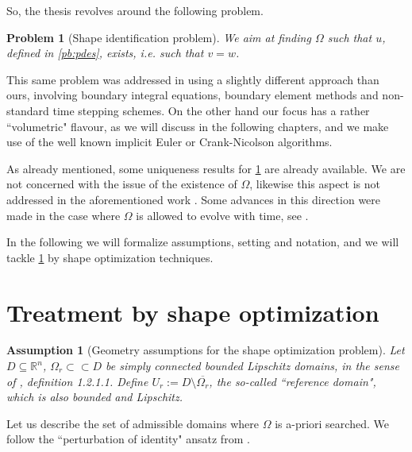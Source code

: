 \documentclass[english,a4paper,10pt,oneside]{scrbook}	%
\theoremstyle{break}
\newtheorem{ass}[equation]{Assumption}
\newtheorem{pb}[equation]{Problem}
\theoremstyle{remark}
\newcommand{\mR}{\mathbb{R}}
\newcommand{\cc}{\subset\subset}
\begin{document}

So, the thesis revolves around the following problem.

\begin{pb}[Shape identification problem]
\label{pb:shid}
We aim at finding $\Omega$ such that $u$, defined in \cref{pb:pdes}, exists, i.e. such that $v=w$.
\end{pb}

This same problem was addressed in \cite{harbrecht} using a slightly different approach than ours, involving boundary integral equations, boundary element methods and non-standard time stepping schemes. On the other hand our focus has a rather ``volumetric" flavour, as we will discuss in the following chapters, and we make use of the well known implicit Euler or Crank-Nicolson algorithms.

As already mentioned, some uniqueness results for \cref{pb:shid} are already available. We are not concerned with the issue of the existence of $\Omega$, likewise this aspect is not addressed in the aforementioned work \cite{harbrecht}. Some advances in this direction were made in the case where $\Omega$ is allowed to evolve with time, see \cite{brugger}.

In the following we will formalize assumptions, setting and notation, and we will tackle \cref{pb:shid} by shape optimization techniques.

\section{Treatment by shape optimization}
\label{sec:shopt_treatment}

\begin{ass}[Geometry assumptions for the shape optimization problem]
\label{ass:geo_sh}
Let $D\subseteq \mR^n$, $\Omega_r \cc D$ be simply connected bounded Lipschitz domains, in the sense of \cite{grisvard}, definition 1.2.1.1. Define $U_r:=D\setminus \overline{\Omega_r}$, the so-called ``reference domain", which is also bounded and Lipschitz.
\end{ass}

Let us describe the set of admissible domains where $\Omega$ is a-priori searched. We follow the ``perturbation of identity" ansatz from \cite{murat}.
\end{document}
